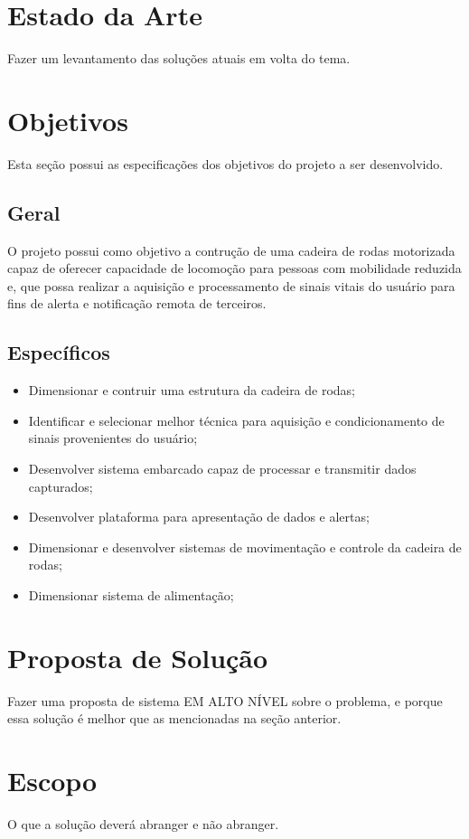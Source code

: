 \section{Estado da Arte}

Fazer um levantamento das soluções atuais em volta do tema.

\section{Objetivos}
Esta seção possui as especificações dos objetivos do projeto a ser desenvolvido.

\subsection{Geral}
O projeto possui como objetivo a contrução de uma cadeira de rodas motorizada capaz de
oferecer capacidade de locomoção para pessoas com mobilidade reduzida
e, que possa realizar
a aquisição e processamento de sinais vitais do usuário para fins de alerta e notificação
remota de terceiros.

\subsection{Específicos}

\begin{itemize}
\item Dimensionar e contruir uma estrutura da cadeira de rodas;
\item Identificar e selecionar melhor técnica para aquisição e condicionamento de sinais provenientes do usuário;
\item Desenvolver sistema embarcado capaz de processar e transmitir dados capturados;
\item Desenvolver plataforma para apresentação de dados e alertas;
\item Dimensionar e desenvolver sistemas de movimentação e controle da cadeira de rodas;
\item Dimensionar sistema de alimentação;
\end{itemize}

\section{Proposta de Solução}

Fazer uma proposta de sistema EM ALTO NÍVEL sobre o problema, e porque essa solução é melhor que as mencionadas na seção anterior.

\section{Escopo}

O que a solução deverá abranger e não abranger.
